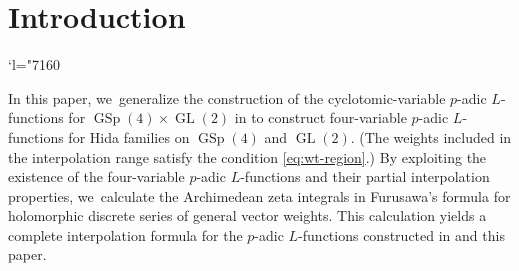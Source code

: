 \documentclass[JEP,XML,SOM,Unicode,published]{cedram}
\newcommand{\Changel}{\mathcode`l="7160}
\newcommand{\Lfunctions}{$L$\nobreakdash-func\-tions\xspace}
\theoremstyle{plain}
\theoremstyle{remark}
\DeclareMathOperator{\GL}{GL}
\DeclareMathOperator{\GSp}{GSp}
\begin{document}
\maketitle
\vspace*{-\baselineskip}
\tableofcontents
\mainmatter

\section{Introduction}
\Changel

In this paper, we~generalize the construction of the cyclotomic-variable $p$-adic \Lfunctions for $\GSp(4)\times\GL(2)$ in \cite{pFL} to construct four-variable $p$-adic \Lfunctions for Hida families on $\GSp(4)$ and $\GL(2)$. (The weights included in the interpolation range satisfy the condition \eqref{eq:wt-region}.) By exploiting the existence of the four-variable $p$-adic \Lfunctions and their partial interpolation properties, we~calculate the Archimedean zeta integrals in Furusawa's formula for holomorphic discrete series of general vector weights. This calculation yields a complete interpolation formula for the $p$-adic \Lfunctions constructed in \loccit and this paper.
\end{document}
